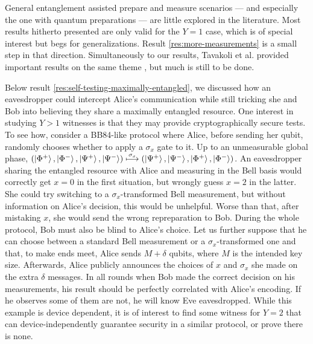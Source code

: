     General entanglement assisted prepare and measure scenarios --- and especially the one with quantum preparations --- are little explored in the literature. Most results hitherto presented are only valid for the $Y=1$ case, which is of special interest but begs for generalizations. Result \ref{res:more-measurements} is a small step in that direction. Simultaneously to our results, Tavakoli et al. provided important results on the same theme \cite{tavakoli_eapam_2021}, but much is still to be done.

    Below result \ref{res:self-testing-maximally-entangled}, we discussed how an eavesdropper could intercept Alice's communication while still tricking she and Bob into believing they share a maximally entangled resource. One interest in studying $Y > 1$ witnesses is that they may provide cryptographically secure tests. To see how, consider a BB84-like protocol \cite{bb84} where Alice, before sending her qubit, randomly chooses whether to apply a $\sigma_x$ gate to it. Up to an unmeasurable global phase, $\left( \ket{\Phi^+}, \ket{\Phi^-}, \ket{\Psi^+}, \ket{\Psi^-} \right) \overset{\sigma_x}{\longmapsto} ( \ket{\Psi^+}, \ket{\Psi^-}, \ket{\Phi^+}, \ket{\Phi^-})$. An eavesdropper sharing the entangled resource with Alice and measuring in the Bell basis would correctly get $x=0$ in the first situation, but wrongly guess $x=2$ in the latter. She could try switching to a $\sigma_x$-transformed Bell measurement, but without information on Alice's decision, this would be unhelpful. Worse than that, after mistaking $x$, she would send the wrong repreparation to Bob. During the whole protocol, Bob must also be blind to Alice's choice. Let us further suppose that he can choose between a standard Bell measurement or a $\sigma_x$-transformed one and that, to make ends meet, Alice sends $M + \delta$ qubits, where $M$ is the intended key size. Afterwards, Alice publicly announces the choices of $x$ and $\sigma_x$ she made on the extra $\delta$ messages. In all rounds when Bob made the correct decision on his measurements, his result should be perfectly correlated with Alice's encoding. If he observes some of them are not, he will know Eve eavesdropped. While this example is device dependent, it is of interest to find some witness for $Y=2$ that can device-independently guarantee security in a similar protocol, or prove there is none.